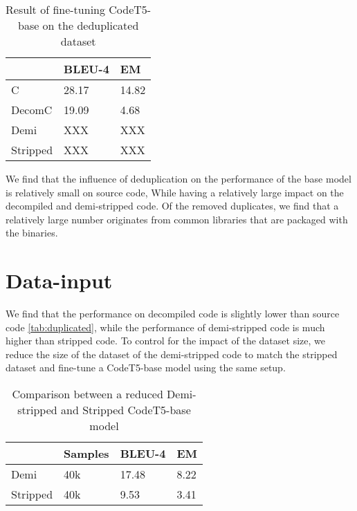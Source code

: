 \label{tab:deduplicated}
\begin{table}[!h]
\centering
\begin{tabular}{lll}
\hline
\rowcolor[HTML]{C0C0C0} 
\multicolumn{1}{|l}{\cellcolor[HTML]{C0C0C0}\textbf{Deduplicated}} & BLEU-4  & \multicolumn{1}{l|}{\cellcolor[HTML]{C0C0C0}EM} \\ \hline
C                                                                  & 28.17 & 14.82                                           \\
DecomC                                                             & 19.09 & 4.68                                            \\
Demi                                                           & XXX   & XXX                                             \\
Stripped                                                               & XXX   & XXX                                            
\end{tabular}
\caption{Result of fine-tuning CodeT5-base on the deduplicated dataset}
\end{table}
We find that the influence of deduplication on the performance of the base model is relatively small on source code, While having a relatively large impact on the decompiled and demi-stripped code. 
Of the removed duplicates, we find that a relatively large number originates from common libraries that are packaged with the binaries. 


\section{Data-input}
We find that the performance on decompiled code is slightly lower than source code \ref{tab:duplicated}, while the performance of demi-stripped code is much higher than stripped code. To control for the impact of the dataset size, we reduce the size of the dataset of the demi-stripped code to match the stripped dataset and fine-tune a CodeT5-base model using the same setup.
\label{tab:demiSize}
\begin{table}[!h]
\centering
\begin{tabular}{llll}
\hline
\rowcolor[HTML]{C0C0C0} 
\multicolumn{1}{|l}{\cellcolor[HTML]{C0C0C0}\textbf{}} & Samples & BLEU-4 & \multicolumn{1}{l|}{\cellcolor[HTML]{C0C0C0}EM} \\ \hline
Demi                                                   & 40k     & 17.48  & 8.22
                                       \\
Stripped                                               & 40k     & 9.53   & 3.41                                           
\end{tabular}
\caption{Comparison between a reduced Demi-stripped and Stripped CodeT5-base model}
\end{table}

